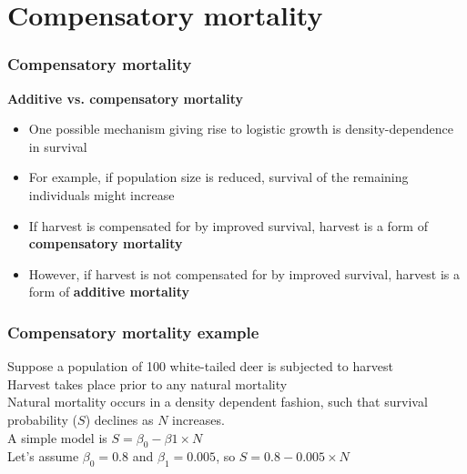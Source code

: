 \documentclass[color=usenames,dvipsnames,handout]{beamer}\usepackage[]{graphicx}\usepackage[]{color}
\begin{document}
\section{Compensatory mortality}






\begin{frame}
  \frametitle{Compensatory mortality}
  \large
  {\bf Additive vs. compensatory mortality}
  \begin{itemize}[<+->]
    \item One possible mechanism giving rise to logistic growth is
      density-dependence in survival
    \item For example, if population size is reduced, survival of the
      remaining individuals might increase
    \item If harvest is compensated for by improved survival, harvest
      is a form of \alert{\bf compensatory mortality}
    \item However, if harvest is not compensated for by improved
      survival, harvest is a form of \alert{\bf additive mortality}
  \end{itemize}
  \vfill
\end{frame}



\begin{frame}
  \frametitle{Compensatory mortality example}
  \large
  Suppose a population of 100 white-tailed deer is subjected to
  harvest \\
  \pause \vfill
  Harvest takes place prior to any natural mortality \\
  \pause \vfill
  Natural mortality occurs in a density dependent fashion,
  such that survival probability ($S$) declines as $N$ increases. \\
  \pause \vfill
  A simple model is $S = \beta_0 - \beta1 \times N$ \\
  \pause \vfill
  Let's assume $\beta_0 = 0.8$ and $\beta_1 = 0.005$, so
  $S = 0.8 - 0.005 \times N$
\end{frame}
\end{document}
